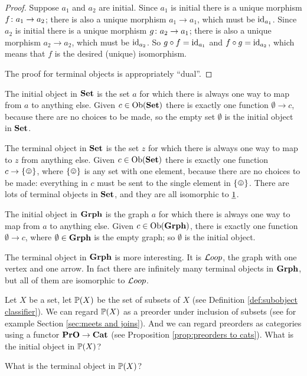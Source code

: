 \begin{proof}

Suppose $a_1$ and $a_2$ are initial. Since $a_1$ is initial there is a unique morphism $f\colon a_1\rightarrow a_2$; there is also a unique morphism $a_1\to a_1$, which must be $\textnormal{id}_{a_1}$. Since $a_2$ is initial there is a unique morphism $g\colon a_2\rightarrow a_1$; there is also a unique morphism $a_2\to a_2$, which must be $\textnormal{id}_{a_2}$. So $g\circ f=\textnormal{id}_{a_1}$ and $f\circ g=\textnormal{id}_{a_2}$, which means that $f$ is the desired (unique) isomorphism.

The proof for terminal objects is appropriately “dual”.

\end{proof}

\begin{example}\label{ex:universal obs in set}

The initial object in ${\bf Set}$ is the set $a$ for which there is always one way to map from $a$ to anything else. Given $c\in\textnormal{Ob}({\bf Set})$ there is exactly one function $\emptyset\to c$, because there are no choices to be made, so the empty set $\emptyset$ is the initial object in ${\bf Set}$.

The terminal object in ${\bf Set}$ is the set $z$ for which there is always one way to map to $z$ from anything else. Given $c\in\textnormal{Ob}({\bf Set})$ there is exactly one function $c\to\singleton$, where $\singleton$ is any set with one element, because there are no choices to be made: everything in $c$ must be sent to the single element in $\singleton$. There are lots of terminal objects in ${\bf Set}$, and they are all isomorphic to $\underline{1}$.

\end{example}

\begin{example}

The initial object in ${\bf Grph}$ is the graph $a$ for which there is always one way to map from $a$ to anything else. Given $c\in\textnormal{Ob}({\bf Grph})$, there is exactly one function $\emptyset\to c$, where $\emptyset\in{\bf Grph}$ is the empty graph; so $\emptyset$ is the initial object.

The terminal object in ${\bf Grph}$ is more interesting. It is ${\mathcal{L} oop}$, the graph with one vertex and one arrow. In fact there are infinitely many terminal objects in ${\bf Grph}$, but all of them are isomorphic to ${\mathcal{L} oop}$. 

\end{example}

\begin{exercise}
Let $X$ be a set, let ${\mathbb P}(X)$ be the set of subsets of $X$ (see Definition \ref{def:subobject classifier}). We can regard ${\mathbb P}(X)$ as a preorder under inclusion of subsets (see for example Section \ref{sec:meets and joins}). And we can regard preorders as categories using a functor ${\bf PrO}\rightarrow{\bf Cat}$ (see Proposition \ref{prop:preorders to cats}).
\sexc What is the initial object in ${\mathbb P}(X)$?
\item What is the terminal object in ${\mathbb P}(X)$? 
\endsexc
\end{exercise}

